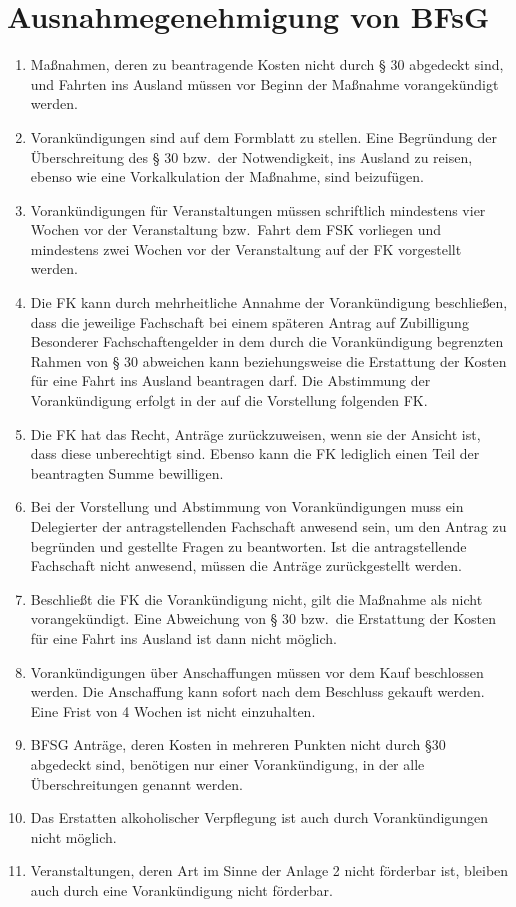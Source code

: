 \documentclass{article}
\begin{document}
\section{Ausnahmegenehmigung von BFsG}
\begin{enumerate}[(1)]
    \item Maßnahmen, deren zu beantragende Kosten nicht durch § 30 abgedeckt sind, und Fahrten ins Ausland müssen vor Beginn der Maßnahme vorangekündigt werden.
    \item Vorankündigungen sind auf dem Formblatt zu stellen. 
    	Eine Begründung der Überschreitung des § 30 bzw.\ der Notwendigkeit, ins Ausland zu reisen, ebenso wie eine Vorkalkulation der Maßnahme, sind beizufügen.
    \item Vorankündigungen für Veranstaltungen müssen schriftlich mindestens vier Wochen vor der Veranstaltung bzw.\ Fahrt dem FSK vorliegen und mindestens zwei Wochen vor der Veranstaltung auf der FK vorgestellt werden.
    \item Die FK kann durch mehrheitliche Annahme der Vorankündigung beschließen, dass die jeweilige Fachschaft bei einem späteren Antrag auf Zubilligung Besonderer Fachschaftengelder in dem durch die Vorankündigung begrenzten Rahmen von § 30 abweichen kann beziehungsweise die Erstattung der Kosten für eine Fahrt ins Ausland beantragen darf. 
    	Die Abstimmung der Vorankündigung erfolgt in der auf die Vorstellung folgenden FK.
    \item Die FK hat das Recht, Anträge zurückzuweisen, wenn sie der Ansicht ist, dass diese unberechtigt sind. 
    	Ebenso kann die FK lediglich einen Teil der beantragten Summe bewilligen.
    \item Bei der Vorstellung und Abstimmung von Vorankündigungen muss ein Delegierter der antragstellenden Fachschaft anwesend sein, um den Antrag zu begründen und gestellte Fragen zu beantworten. 
    	Ist die antragstellende Fachschaft nicht anwesend, müssen die Anträge zurückgestellt werden.
    \item Beschließt die FK die Vorankündigung nicht, gilt die Maßnahme als nicht vorangekündigt. 
    	Eine Abweichung von § 30 bzw.\ die Erstattung der Kosten für eine Fahrt ins Ausland ist dann nicht möglich.
    \item Vorankündigungen über Anschaffungen müssen vor dem Kauf beschlossen werden. 
    	Die Anschaffung kann sofort nach dem Beschluss gekauft werden. 
    	Eine Frist von 4 Wochen ist nicht einzuhalten.
    \item BFSG Anträge, deren Kosten in mehreren Punkten nicht durch §30 abgedeckt sind, benötigen nur einer Vorankündigung, in der alle Überschreitungen genannt werden.
    \item Das Erstatten alkoholischer Verpflegung ist auch durch Vorankündigungen nicht möglich.
    \item Veranstaltungen, deren Art im Sinne der Anlage 2 nicht förderbar ist,  bleiben auch durch eine Vorankündigung nicht förderbar.
    
\end{enumerate}
 
\end{document}
